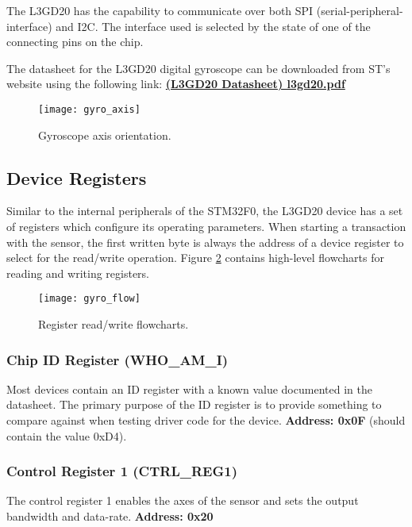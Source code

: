 \documentclass[openany,11pt,fleqn]{book} %
\begin{document}
The L3GD20 has the capability to communicate over both SPI (serial-peripheral-interface) and I2C. The interface used is selected by the state of one of the connecting pins on the chip. 

The datasheet for the L3GD20 digital gyroscope can be downloaded from ST's website using the following link: \href{http://www.st.com/resource/en/datasheet/l3gd20.pdf}{\textbf{(L3GD20 Datasheet) l3gd20.pdf}}

\begin{figure}[]
    \centering\texttt{[image: gyro\_axis]}
    \caption{Gyroscope axis orientation.}
    \label{gyro_axis}
\end{figure}

\subsection{Device Registers}
Similar to the internal peripherals of the STM32F0, the L3GD20 device has a set of registers which configure its operating parameters. When starting a transaction with the sensor, the first written byte is always the address of a device register to select for the read/write operation. Figure \ref{gyro_flow} contains high-level flowcharts for reading and writing registers. 

\begin{figure}[]
    \centering\texttt{[image: gyro\_flow]}
    \caption{Register read/write flowcharts.}
    \label{gyro_flow}
\end{figure}


\subsubsection{Chip ID Register (WHO\_AM\_I)}
Most devices contain an ID register with a known value documented in the datasheet. The primary purpose of the ID register is to provide something to compare against when testing driver code for the device.  \textbf{Address: 0x0F} (should contain the value 0xD4).

\subsubsection{Control Register 1 (CTRL\_REG1)}
The control register 1 enables the axes of the sensor and sets the output bandwidth and data-rate. \textbf{Address: 0x20}
\end{document}
